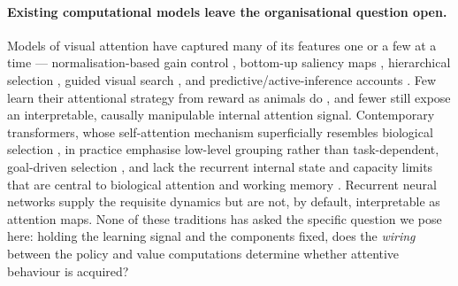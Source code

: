\paragraph{Existing computational models leave the organisational question open.}
Models of visual attention have captured many of its features one or a few at a
time --- normalisation-based gain control \citep{reynolds2009normalization},
bottom-up saliency maps \citep{itti2001computational, koch1985shifts}, hierarchical
selection \citep{tsotsos1995modeling}, guided visual search
\citep{wolfe2021guided}, and predictive/active-inference accounts
\citep{feldman2010attention, parr2017working, mirza2018human}. Few learn their
attentional strategy from reward as animals do
\citep{chelazzi2013reward, anderson2016attention, failing2018selection,
mnih2014recurrent}, and fewer still expose an interpretable, causally manipulable
internal attention signal. Contemporary transformers, whose self-attention
mechanism superficially resembles biological selection
\citep{vaswani2017attention, dosovitskiy2020image, khan2022transformers}, in
practice emphasise low-level grouping rather than task-dependent, goal-driven
selection \citep{mehrani2023self}, and lack the recurrent internal state and
capacity limits that are central to biological attention and working memory
\citep{luck1997capacity, awh2006interactions, panichello2021attvwm}. Recurrent
neural networks supply the requisite dynamics \citep{hochreiter1997long,
beck2024xlstm, sussillo2014neural, mante2013context} but are not, by default,
interpretable as attention maps. None of these traditions has asked the specific
question we pose here: holding the learning signal and the components fixed, does
the \emph{wiring} between the policy and value computations determine whether
attentive behaviour is acquired?

